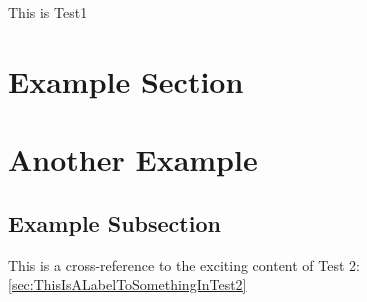 \documentclass[11 pt]{article}
\begin{document}
	
	This is Test1
	
	\section{Example Section}
	
	\lipsum[2]
	
	\section{Another Example}
	
	\subsection{Example Subsection}
	
	This is a cross-reference to the exciting content of Test 2: \ref{sec:ThisIsALabelToSomethingInTest2}
	
\end{document}
